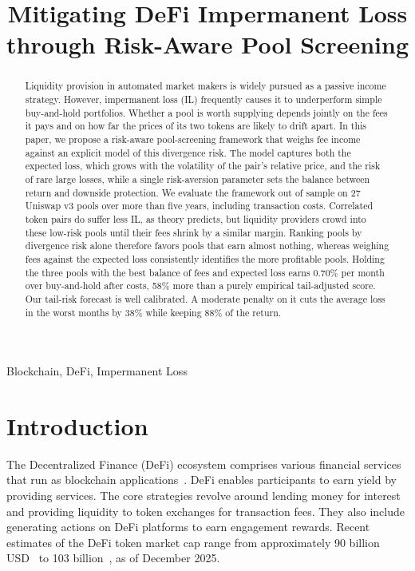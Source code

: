 \documentclass[10pt,conference,compsocconf]{IEEEtran}
\title{Mitigating DeFi Impermanent Loss through Risk-Aware Pool Screening}
\author{
\IEEEauthorblockN{Arad Kotzer and Ori Rottenstreich}
\IEEEauthorblockA{
Technion %
}
}
\begin{document}
\maketitle

\begin{abstract}
Liquidity provision in automated market makers is widely pursued as a passive income strategy. However, impermanent loss (IL) frequently causes it to underperform simple buy-and-hold portfolios. Whether a pool is worth supplying depends jointly on the fees it pays and on how far the prices of its two tokens are likely to drift apart. In this paper, we propose a risk-aware pool-screening framework that weighs fee income against an explicit model of this divergence risk. The model captures both the expected loss, which grows with the volatility of the pair's relative price, and the risk of rare large losses, while a single risk-aversion parameter sets the balance between return and downside protection. We evaluate the framework out of sample on 27 Uniswap v3 pools over more than five years, including transaction costs. Correlated token pairs do suffer less IL, as theory predicts, but liquidity providers crowd into these low-risk pools until their fees shrink by a similar margin. Ranking pools by divergence risk alone therefore favors pools that earn almost nothing, whereas weighing fees against the expected loss consistently identifies the more profitable pools. Holding the three pools with the best balance of fees and expected loss earns 0.70\% per month over buy-and-hold after costs, 58\% more than a purely empirical tail-adjusted score. Our tail-risk forecast is well calibrated. A moderate penalty on it cuts the average loss in the worst months by 38\% while keeping 88\% of the return.
\end{abstract}


\begin{IEEEkeywords}
Blockchain, DeFi, Impermanent Loss
\end{IEEEkeywords}

\section{Introduction}

The Decentralized Finance (DeFi) ecosystem comprises various financial services that run as blockchain applications~\cite{schar2021decentralized, zetzsche2020decentralized, jensen2021introduction, Bitcoin, wood2014ethereum}. DeFi enables participants to earn yield by providing services. The core strategies revolve around lending money for interest and providing liquidity to token exchanges for transaction fees. They also include generating actions on DeFi platforms to earn engagement rewards. Recent estimates of the DeFi token market cap range from approximately 90 billion USD~\cite{forbes2025defi} to 103 billion~\cite{coingecko2025defi}, as of December 2025.
\end{document}
